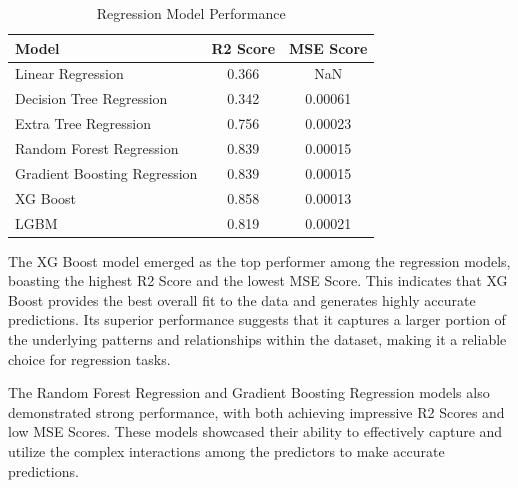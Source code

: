 \begin{table}[h]
	\caption{Regression Model Performance}
	\label{tab:model-performance}
	\centering
	\begin{tabular}{|l|c|c|}
		\hline
		\textbf{Model} & \textbf{R2 Score} & \textbf{MSE Score} \\
		\hline
		Linear Regression & 0.366 & NaN \\
		Decision Tree Regression & 0.342 & 0.00061 \\
		Extra Tree Regression & 0.756 & 0.00023 \\
		Random Forest Regression & 0.839 & 0.00015 \\
		Gradient Boosting Regression & 0.839 & 0.00015 \\
		XG Boost & 0.858 & 0.00013 \\
		LGBM & 0.819 & 0.00021 \\
		\hline
	\end{tabular}
\end{table}

The XG Boost model emerged as the top performer among the regression models, boasting the highest R2 Score and the lowest MSE Score. This indicates that XG Boost provides the best overall fit to the data and generates highly accurate predictions. Its superior performance suggests that it captures a larger portion of the underlying patterns and relationships within the dataset, making it a reliable choice for regression tasks.

The Random Forest Regression and Gradient Boosting Regression models also demonstrated strong performance, with both achieving impressive R2 Scores and low MSE Scores. These models showcased their ability to effectively capture and utilize the complex interactions among the predictors to make accurate predictions.



